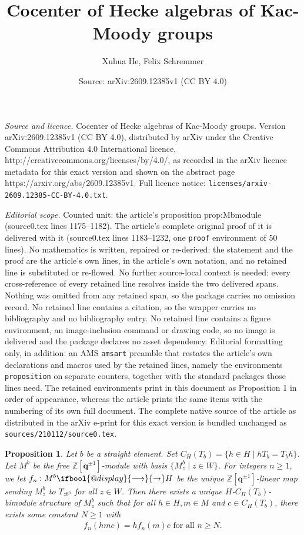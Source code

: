 \documentclass[10pt,a4paper]{amsart}
\title{Cocenter of Hecke algebras of Kac-Moody groups}
\author{Xuhua He, Felix Schremmer}
\date{Source: arXiv:2609.12385v1 (CC BY 4.0)}
\makeatletter
\newtheorem{proposition}{Proposition}
\newcommand\q{\mathbf q}
\renewcommand{\to}{%
   \ifbool{@display}{\longrightarrow}{\rightarrow}%
   }
\makeatother
\begin{document}
\maketitle

\noindent\emph{Source and licence.} Cocenter of Hecke algebras of Kac-Moody groups. Version arXiv:2609.12385v1 (CC BY 4.0), distributed by arXiv under the Creative Commons Attribution 4.0 International licence, http://creativecommons.org/licenses/by/4.0/, as recorded in the arXiv licence metadata for this exact version and shown on the abstract page https://arxiv.org/abs/2609.12385v1. Full licence notice: \texttt{licenses/arxiv-2609.12385-CC-BY-4.0.txt}.\par\smallskip

\noindent\textit{Editorial scope.} Counted unit: the article's proposition prop:Mbmodule (source0.tex lines 1175--1182). The article's complete original proof of it is delivered with it (source0.tex lines 1183--1232, one \texttt{proof} environment of 50 lines). No mathematics is written, repaired or re-derived: the statement and the proof are the article's own lines, in the article's own notation, and no retained line is substituted or re-flowed.  No further source-local context is needed: every cross-reference of every retained line resolves inside the two delivered spans.  Nothing was omitted from any retained span, so the package carries no omission record.  No retained line contains a citation, so the wrapper carries no bibliography and no bibliography entry.  No retained line contains a figure environment, an image-inclusion command or drawing code, so no image is delivered and the package declares no asset dependency.  Editorial formatting only, in addition: an AMS \texttt{amsart} preamble that restates the article's own declarations and macros used by the retained lines, namely the environments \texttt{proposition} on separate counters, together with the standard packages those lines need.  The retained environments print in this document as Proposition 1 in order of appearance, whereas the article prints the same items with the numbering of its own full document.  The complete native source of the article as distributed in the arXiv e-print for this exact version is bundled unchanged as \texttt{sources/210112/source0.tex}.
\begin{proposition}
\label{prop:Mbmodule}
Let $b$ be a straight element. Set $C_H(T_b)= \{h\in H\mid h T_b = T_b h\}$. Let $M^b$ be the free $\mathbb Z[\q^{\pm 1}]$-module with basis $\{M^b_z\mid z\in W\}$.
For integers $n\geq 1$, we let $f_n:M^b\to H$ be the unique $\mathbb Z[\q^{\pm 1}]$-linear map sending $M^b_z$ to $T_{zb^n}$ for all $z\in W$. Then there exists a unique $H$-$C_H(T_b)$-bimodule structure of $M^b_z$ such that for all $h\in H, m\in M$ and $c\in C_H(T_b)$, there exists some constant $N\geq 1$ with
        \begin{align*}
            f_n(hmc) = h f_n(m) c\text{ for all }n\geq N.
        \end{align*}
\end{proposition}
\end{document}
